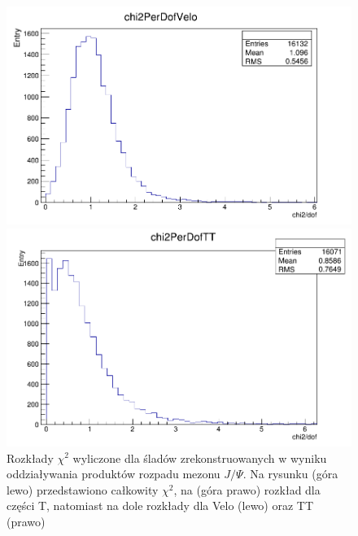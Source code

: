 \begin{figure}[H]
\vspace*{0.5cm} %
\begin{minipage}[t]{0.55\textwidth}
\includegraphics[width=\linewidth]{rozdzial6/JPsi_chi2Velo.png}
\end{minipage}
\hspace{\fill}
\begin{minipage}[t]{0.55\textwidth}
\includegraphics[width=\linewidth]{rozdzial6/JPsi_chi2TT.png}
\end{minipage}
\caption{Rozkłady $\chi^2$ wyliczone dla śladów zrekonstruowanych w wyniku oddziaływania produktów rozpadu mezonu $J/\Psi$. Na rysunku (góra lewo) przedstawiono całkowity $\chi^2$, na (góra prawo) rozkład dla części T, natomiast na dole rozkłady dla Velo (lewo) oraz TT (prawo) } \label{chi2JPsi}
\end{figure}


